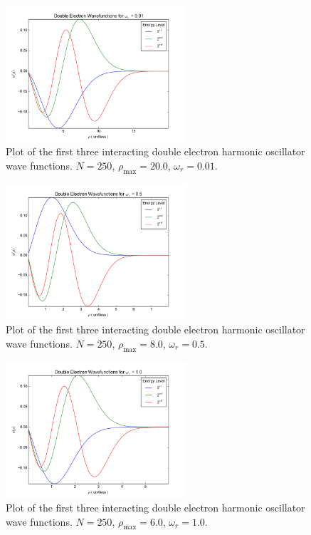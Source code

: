 \documentclass[a4paper,12pt]{report}
\begin{document}
\begin{figure}
\centering
 \includegraphics[width=0.6\textwidth]{DeHoWfWr001.png}
 \caption{Plot of the first three interacting double electron harmonic oscillator wave functions. $N = 250$, $\rho_{\mathrm{max}} = 20.0$, $\omega_r = 0.01$.}
 \label{fig:de001}
\end{figure}

\begin{figure}
\centering
 \includegraphics[width=0.6\textwidth]{DeHoWfWr05.png}
 \caption{Plot of the first three interacting double electron harmonic oscillator wave functions. $N = 250$, $\rho_{\mathrm{max}} = 8.0$, $\omega_r = 0.5$.}
 \label{fig:de05}
\end{figure}

\begin{figure}
\centering
 \includegraphics[width=0.6\textwidth]{DeHoWfWr1.png}
 \caption{Plot of the first three interacting double electron harmonic oscillator wave functions. $N = 250$, $\rho_{\mathrm{max}} = 6.0$, $\omega_r = 1.0$.}
 \label{fig:de1}
\end{figure}
\end{document}
